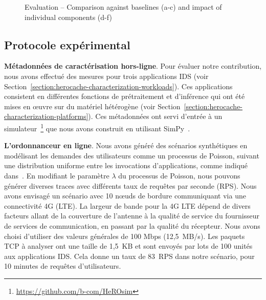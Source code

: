 \begin{figure}[t]
{    }
    \caption{Evaluation -- Comparison against baselines (a-c) and impact of individual components (d-f)}
    \label{figure:herocache-evaluation}
\end{figure}

\subsection{Protocole expérimental}

\textbf{Métadonnées de caractérisation hors-ligne}. Pour évaluer notre contribution, nous avons effectué des mesures pour trois applications IDS (voir Section~\ref{section:herocache-characterization-workloads}). Ces applications consistent en différentes fonctions de prétraitement et d'inférence qui ont été mises en œuvre sur du matériel hétérogène (voir Section~\ref{section:herocache-characterization-platforms}). Ces métadonnées ont servi d'entrée à un simulateur~\footnote{\href{https://github.com/b-com/HeROsim}{https://github.com/b-com/HeROsim}} que nous avons construit en utilisant SimPy~\cite{simpy}.

\textbf{L'ordonnanceur en ligne}. Nous avons généré des scénarios synthétiques en modélisant les demandes des utilisateurs comme un processus de Poisson, suivant une distribution uniforme entre les invocations d'applications, comme indiqué dans~\cite{9928755}. En modifiant le paramètre $\lambda$ du processus de Poisson, nous pouvons générer diverses traces avec différents taux de requêtes par seconde (RPS). Nous avons envisagé un scénario avec 10 nœuds de bordure communiquant via une connectivité 4G (LTE). La largeur de bande pour la 4G LTE dépend de divers facteurs allant de la couverture de l'antenne à la qualité de service du fournisseur de services de communication, en passant par la qualité du récepteur. Nous avons choisi d'utiliser des valeurs générales de 100 Mbps (12,5~MB/s). Les paquets TCP à analyser ont une taille de 1,5~KB et sont envoyés par lots de 100 unités aux applications IDS. Cela donne un taux de 83~RPS dans notre scénario, pour 10 minutes de requêtes d'utilisateurs. 

